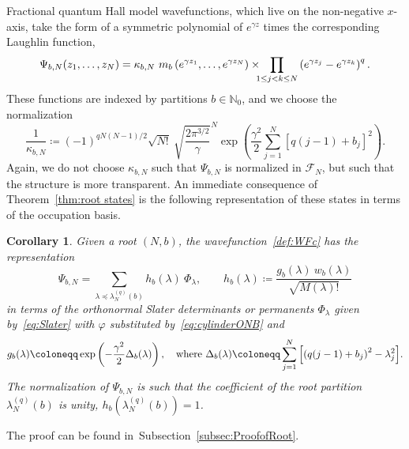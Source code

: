 \documentclass[letterpaper, DIV=17]{scrartcl}
\newtheorem{cor}[theorem]{Corollary}
\numberwithin{equation}{section}
\theoremstyle{definition}
\begin{document}
Fractional quantum Hall model wavefunctions, which live on the non-negative $ x $-axis, take the form of a symmetric polynomial of $ e^{\gamma z} $ times the corresponding Laughlin function,
\begin{equation}\label{def:WFc}
 \Psi_{b,N}(z_1,\dots , z_N)  = \kappa_{b,N} \ m_{b}\left(e^{\gamma z_1}, \dots, e^{\gamma z_N}\right) \times \mkern-10mu \prod_{1\leq j<k\leq N} \left(e^{\gamma z_j}-e^{\gamma z_k} \right)^q .
 \end{equation}
 These functions are indexed by partitions $ b \in \mathbb{N}_0 $, and
we choose the normalization
\begin{equation}\label{eq:norm2cyl}
	\frac{1}{\kappa_{b,N} } \coloneqq (-1)^{qN(N-1)/2}  \sqrt{N!} \ \sqrt{ \frac{2 \pi^{3/2}}{ \gamma}}^{N} \exp\left( \frac{\gamma^2}{2} \sum_{j=1}^N \left[ q(j-1)+ b_j\right]^2\right) .
\end{equation}
Again, we do not choose $\kappa_{b,N}$ such that $\Psi_{b,N}$ is normalized in $\mathcal{F}_N$, but such that the structure is more transparent. An immediate consequence of Theorem~\ref{thm:root states} is the following representation of these states in terms of the occupation basis. 
%
\begin{cor}\label{cor:cyl}
Given a root $(N,b) $,  the wavefunction~\eqref{def:WFc} has the representation
$$ \Psi_{b,N} =  \sum_{ \lambda \preceq \lambda^{(q)}_N(b)  } h_b(\lambda) \ \Phi_\lambda  , \qquad h_b(\lambda) \coloneqq \frac{g_b(\lambda) \ w_b(\lambda)}{\sqrt{M(\lambda)!}} $$
 in terms of the orthonormal Slater determinants or permanents $  \Phi_\lambda $ given by~\eqref{eq:Slater} with $ \varphi$ substituted by~\eqref{eq:cylinderONB} and
\begin{equation}
	g_b(\lambda) \coloneqq 
	    \displaystyle \exp\left( - \frac{\gamma^2}{2} \Delta_b(\lambda) \right) , \quad \mbox{where $ \displaystyle \Delta_b(\lambda) \coloneqq \sum_{j=1}^{N} \left[\left( q(j-1)+ b_j\right)^2-\lambda_j^2\right]$.} 
\end{equation}
The normalization of $  \Psi_{b,N}  $ is such that the coefficient of the root partition $  \lambda^{(q)}_N(b) $ is unity, $ h_b\left(  \lambda^{(q)}_N(b) \right) = 1 $.
\end{cor}
The proof can be found in~Subsection~\ref{subsec:ProofofRoot}. 
\end{document}
